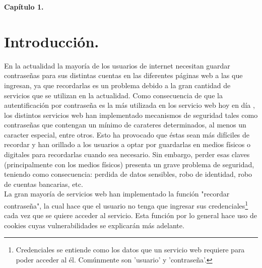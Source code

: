 \documentclass[12pt, a4paper, titlepage]{article}
\begin{document}
	\begin{appendix}
		\renewcommand*\contentsname{{\textcolor{azulescom}{Índice.}}}
		\tableofcontents
		\newpage
		\renewcommand*\listfigurename{{\textcolor{azulescom}{Índice de figuras.}}}
		\listoffigures
		\newpage
		\newpage
		\renewcommand*\listtablename{{\textcolor{azulescom}{Índice de cuadros.}}}
		\listoftables
		
		\newpage
		\renewcommand*\glossaryname{{\textcolor{azulescom}{Glosario.}}}
		
		\printglossary
	\end{appendix}
	\newpage
	
	\textbf{\textcolor{azulescom}{\Huge{Capítulo 1.}}}

	\renewcommand\thesection{\arabic{section}}	
	\section{\textcolor{azulescom}{Introducción.}}
		
		En la actualidad la mayor\'ia de los usuarios de internet necesitan guardar contraseñas para sus distintas cuentas en las diferentes páginas web a las que ingresan, ya que recordarlas es un problema debido a la gran cantidad de servicios que se utilizan en la actualidad. Como consecuencia de que la autentificaci\'on por contraseña es la más utilizada en los servicio web hoy en día \cite{ComparisonAuthenticationMethodsResources}, los distintos servicios web han implementado mecanismos de seguridad tales como contraseñas que contengan un mínimo de carateres determinados, al menos un caracter especial, entre otros. Esto ha provocado que éstas sean más difíciles de recordar y han orillado a los usuarios a optar por guardarlas en medios físicos o digitales para recordarlas cuando sea necesario. 
		Sin embargo, perder esas claves (principalmente con los medios físicos) presenta un grave problema de seguridad, teniendo como consecuencia: perdida de datos sensibles, robo de identidad, robo de cuentas bancarias, etc.\\
		
		La gran mayoría de servicios web han implementado la función "recordar contraseña", la cual hace que el usuario no tenga que ingresar sus credenciales\footnote{Credenciales se entiende como los datos que un servicio web requiere para poder acceder al él. Comúnmente son 'usuario' y 'contraseña'.} cada vez que se quiere acceder al servicio. Esta función por lo general hace uso de cookies cuyas vulnerabilidades se explicarán más adelante.
	    
\end{document}
